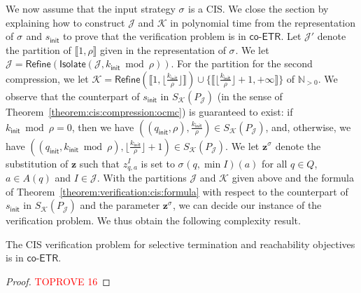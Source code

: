 \documentclass[a4paper,UKenglish,cleveref,autoref,thm-restate,colorlinks]{lipics-v2021}
\newcommand{\init}{\mathsf{init}}
\newcommand{\integerInterval}[1]{\llbracket{}#1\rrbracket{}}
\newcommand{\coetr}{\textsf{co-ETR}}
\newcommand{\IN}{\mathbb{N}}
\newcommand{\INpos}{\IN_{>0}}
\newcommand{\mdpStateSpace}{S}
\newcommand{\ocStateSpace}{Q}
\newcommand{\ocState}{q}
\newcommand{\ocCount}{k}
\newcommand{\ocConfig}{s}
\newcommand{\ocActionSpace}{A}
\newcommand{\ocAction}{a}
\newcommand{\period}{\rho}
\newcommand{\intPartB}{\mathcal{J}}
\newcommand{\intPartC}{\mathcal{K}}
\newcommand{\interval}{I}
\newcommand{\cisChainStateSpace}{P_{\intPartB}}
\newcommand{\compressCisStateSpace}{\mdpStateSpace_{\intPartC}({\cisChainStateSpace})}
\newcommand{\varStrat}{z}
\newcommand{\varStratTuple}{\mathbf{\varStrat}}
\newcommand{\vectStratTuple}{\varStratTuple^\strat}
\newcommand{\stratGeneric}[1]{{\sigma_{#1}}}
\newcommand{\strat}{\stratGeneric{}}
\begin{document}
We now assume that the input strategy $\strat$ is a CIS.
We close the section by explaining how to construct $\intPartB$ and $\intPartC$ in polynomial time from the representation of $\strat$ and $\ocConfig_\init$ to prove that the verification problem is in $\coetr$.
Let $\intPartB'$ denote the partition of $\integerInterval{1, \period}$ given in the representation of $\strat$.
We let $\intPartB=\mathsf{Refine}(\mathsf{Isolate}(\intPartB, \ocCount_\init\bmod\period))$.
For the partition for the second compression, we let $\intPartC=\mathsf{Refine}(\integerInterval{1, \lfloor\frac{\ocCount_\init}{\period}\rfloor})\cup\{\integerInterval{\lfloor{\frac{\ocCount_\init}{\period}\rfloor+1, +\infty}}\}$ of $\INpos$.
We observe that the counterpart of $\ocConfig_\init$ in $\compressCisStateSpace$ (in the sense of Theorem~\ref{theorem:cis:compression:ocmc}) is guaranteed to exist: if $\ocCount_\init\bmod\period=0$, then we have $((\ocState_\init, \period), \frac{\ocCount_\init}{\period})\in\compressCisStateSpace$, and, otherwise, we have $((\ocState_\init, \ocCount_\init\bmod\period), \lfloor\frac{\ocCount_\init}{\period}\rfloor+1)\in\compressCisStateSpace$.
We let $\vectStratTuple$ denote the substitution of $\varStratTuple$ such that $\varStrat^\interval_{\ocState, \ocAction}$ is set to $\strat(\ocState, \min\interval)(\ocAction)$ for all $\ocState\in\ocStateSpace$, $\ocAction\in\ocActionSpace(\ocState)$ and $\interval\in\intPartB$.
With the partitions $\intPartB$ and $\intPartC$ given above and the formula of Theorem~\ref{theorem:verification:cis:formula} with respect to the counterpart of $\ocConfig_\init$ in $\compressCisStateSpace$ and the parameter $\vectStratTuple$, we can decide our instance of the verification problem.
We thus obtain the following complexity result.
\begin{theorem}\label{theorem:verification:cis:complexity}
  The CIS verification problem for selective termination and reachability objectives is in $\coetr$.
\end{theorem}
\begin{proof}\textcolor{red}{TOPROVE 16}\end{proof}
\end{document}
